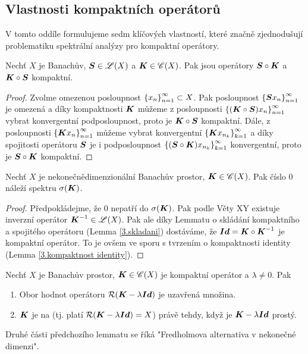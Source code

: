 \subsection{Vlastnosti kompaktních operátorů}
V tomto oddíle formulujeme sedm klíčových vlastností, které značně zjednodušují problematiku spektrální analýzy pro kompaktní operátory.

\begin{lemma} \label{3.skladani}
Nechť $X$ je Banachův, $\boldsymbol{S} \in \mathscr{L} (X)$ a $\boldsymbol{K} \in \mathscr{C}(X)$. Pak jsou operátory $ \boldsymbol{S} \circ \boldsymbol{K}$ a $\boldsymbol{K} \circ \boldsymbol{S}$ kompaktní.
\end{lemma}

\begin{proof}
Zvolme omezenou posloupnost $\left \lbrace x_n \right \rbrace_{n=1}^\infty \subset X$. Pak posloupnost $\left \lbrace \boldsymbol{S} x_n \right \rbrace_{n=1}^\infty$ je omezená a díky kompaktnosti $\boldsymbol{K}$ můžeme z posloupnosti $\left \lbrace (\boldsymbol{K} \circ \boldsymbol{S}) x_n \right \rbrace_{n=1}^\infty$ vybrat konvergentní podposloupnost, proto je $\boldsymbol{K} \circ \boldsymbol{S}$ kompaktní. Dále, z  posloupnosti $\left \lbrace \boldsymbol{K} x_n \right \rbrace_{n=1}^\infty$ můžeme vybrat konvergentní $\left \lbrace \boldsymbol{K} x_{n_k} \right \rbrace_{k=1}^\infty$ a díky spojitosti operátoru $\boldsymbol{S}$ je i podposloupnost $\left \lbrace (\boldsymbol{S} \circ \boldsymbol{K}) x_{n_k} \right \rbrace_{k=1}^\infty$ konvergentní, proto je $\boldsymbol{S} \circ \boldsymbol{K}$ kompaktní.

\end{proof}

\begin{lemma}
Nechť $X$ je nekonečnědimenzionální Banachův prostor, $\boldsymbol{K} \in \mathscr{C}(X)$. Pak číslo $0$ náleží spektru $\sigma(\boldsymbol{K})$.
\end{lemma}

\begin{proof}
Předpokládejme, že $0$ nepatří do $\sigma(\boldsymbol{K})$. Pak podle Věty XY existuje inverzní operátor $ \boldsymbol{K}^{-1} \in \mathscr{L}(X)$. Pak ale díky Lemmatu o skládání kompaktního a spojitého operátoru (Lemma \ref{3.skladani}) dostáváme, že $\boldsymbol{Id} = \boldsymbol{K} \circ \boldsymbol{K}^{-1}$ je kompaktní operátor. To je ovšem ve sporu s tvrzením o kompaktnosti identity (Lemma \ref{3.kompaktnost identity}).
\end{proof}

\begin{lemma}
Nechť $X$ je Banachův prostor, $\boldsymbol{K} \in \mathscr{C}(X)$ je kompaktní operátor a $\lambda \neq 0$. Pak \begin{enumerate}
    \item Obor hodnot operátoru $\mathcal{R}(\boldsymbol{K} - \lambda \boldsymbol{Id})$ je uzavřená množina.
    \item $\boldsymbol{K}$ je na (tj. platí $\mathcal{R}(\boldsymbol{K} - \lambda \boldsymbol{Id} )=X$) právě tehdy, když je $\boldsymbol{K} - \lambda \boldsymbol{Id}$ prostý.
\end{enumerate}
\end{lemma}
\begin{remark}
Druhé části předchozího lemmatu se říká "Fredholmova alternativa v nekonečné dimenzi".
\end{remark}

